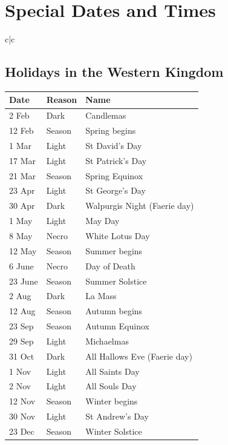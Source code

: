 \section{Special Dates and Times}

\bigskip

\begin{tabular}[t]{c|c}
\begin{minipage}[t]{0.45\linewidth}

\subsection{Holidays in the Western Kingdom}

\begin{tabularx}{\linewidth}[t]{llX}
\textbf{Date} & \textbf{Reason} & \textbf{Name} \\ \hline
2 Feb		& Dark		& Candlemas \\
12 Feb		& Season	& Spring begins \\ \hline
1 Mar		& Light		& St David's Day \\
17 Mar		& Light		& St Patrick's Day \\
21 Mar		& Season	& Spring Equinox \\ \hline
23 Apr		& Light		& St George's Day \\
30 Apr		& Dark		& Walpurgis Night (Faerie day) \\ \hline
1 May		& Light		& May Day \\
8 May		& Necro		& White Lotus Day \\
12 May		& Season	& Summer begins \\ \hline
6 June		& Necro		& Day of Death \\
23 June		& Season	& Summer Solstice \\ \hline
2 Aug		& Dark		& La Mass \\
12 Aug		& Season	& Autumn begins \\ \hline
23 Sep		& Season	& Autumn Equinox \\
29 Sep		& Light		& Michaelmas \\ \hline
31 Oct		& Dark		& All Hallows Eve (Faerie day)\\ \hline
1 Nov		& Light		& All Saints Day \\
2 Nov		& Light		& All Souls Day \\
12 Nov		& Season	& Winter begins \\
30 Nov		& Light		& St Andrew's Day \\ \hline
23 Dec		& Season	& Winter Solstice \\ \hline
\end{tabularx}


\end{minipage}
\end{tabular}
